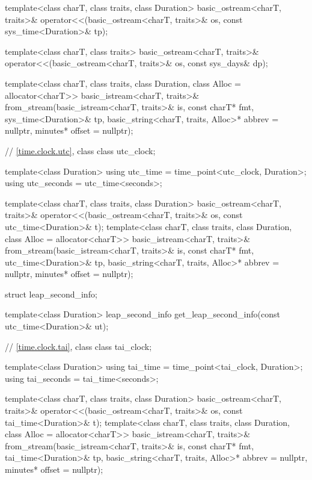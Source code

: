 \begin{codeblock}
{{    template<class charT, class traits, class Duration>
      basic_ostream<charT, traits>&
        operator<<(basic_ostream<charT, traits>& os, const sys_time<Duration>& tp);

    template<class charT, class traits>
      basic_ostream<charT, traits>&
        operator<<(basic_ostream<charT, traits>& os, const sys_days& dp);

    template<class charT, class traits, class Duration, class Alloc = allocator<charT>>
      basic_istream<charT, traits>&
        from_stream(basic_istream<charT, traits>& is, const charT* fmt,
                    sys_time<Duration>& tp,
                    basic_string<charT, traits, Alloc>* abbrev = nullptr,
                    minutes* offset = nullptr);

    // \ref{time.clock.utc}, class 
    class utc_clock;

    template<class Duration>
      using utc_time  = time_point<utc_clock, Duration>;
    using utc_seconds = utc_time<seconds>;

    template<class charT, class traits, class Duration>
      basic_ostream<charT, traits>&
        operator<<(basic_ostream<charT, traits>& os, const utc_time<Duration>& t);
    template<class charT, class traits, class Duration, class Alloc = allocator<charT>>
      basic_istream<charT, traits>&
        from_stream(basic_istream<charT, traits>& is, const charT* fmt,
                    utc_time<Duration>& tp,
                    basic_string<charT, traits, Alloc>* abbrev = nullptr,
                    minutes* offset = nullptr);

    struct leap_second_info;

    template<class Duration>
      leap_second_info get_leap_second_info(const utc_time<Duration>& ut);

    // \ref{time.clock.tai}, class 
    class tai_clock;

    template<class Duration>
      using tai_time  = time_point<tai_clock, Duration>;
    using tai_seconds = tai_time<seconds>;

    template<class charT, class traits, class Duration>
      basic_ostream<charT, traits>&
        operator<<(basic_ostream<charT, traits>& os, const tai_time<Duration>& t);
    template<class charT, class traits, class Duration, class Alloc = allocator<charT>>
      basic_istream<charT, traits>&
        from_stream(basic_istream<charT, traits>& is, const charT* fmt,
                    tai_time<Duration>& tp,
                    basic_string<charT, traits, Alloc>* abbrev = nullptr,
                    minutes* offset = nullptr);

}}
\end{codeblock}
